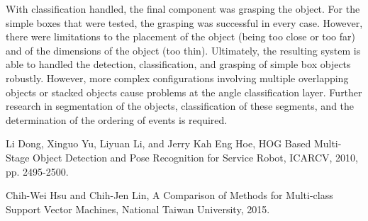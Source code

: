 \documentclass[letterpaper, 10 pt, conference]{conf/ieeeconf}  %
\begin{document}
With classification handled, the final component was grasping the object. For
the simple boxes that were tested, the grasping was successful in every case.
However, there were limitations to the placement of the object (being too close
or too far) and of the dimensions of the object (too thin). Ultimately, the
resulting system is able to handled the detection, classification, and grasping
of simple box objects robustly. However, more complex configurations involving
multiple overlapping objects or stacked objects cause problems at the angle
classification layer. Further research in segmentation of the objects,
classification of these segments, and the determination of the ordering of
events is required.





\addtolength{\textheight}{-12cm}   %




\begin{thebibliography}{99}

 Li Dong, Xinguo Yu, Liyuan Li, and Jerry Kah Eng Hoe, HOG Based
  Multi-Stage Object Detection and Pose Recognition for Service Robot, ICARCV,
  2010, pp. 2495-2500.

 Chih-Wei Hsu and Chih-Jen Lin, A Comparison of Methods for
  Multi-class Support Vector Machines, National Taiwan University, 2015.

\end{thebibliography}
\end{document}
